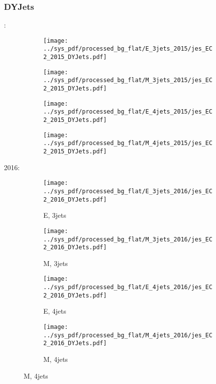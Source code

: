 \documentclass{beamer}
\begin{document}
\begin{frame}
\frametitle{DYJets}
\fontsize{5}{1}:
\begin{figure}
\centering
\begin{subfigure}[b]{0.24\textwidth}
\texttt{[image: ../sys\_pdf/processed\_bg\_flat/E\_3jets\_2015/jes\_EC2\_2015\_DYJets.pdf]}
\end{subfigure}
\begin{subfigure}[b]{0.24\textwidth}
\texttt{[image: ../sys\_pdf/processed\_bg\_flat/M\_3jets\_2015/jes\_EC2\_2015\_DYJets.pdf]}
\end{subfigure}
\begin{subfigure}[b]{0.24\textwidth}
\texttt{[image: ../sys\_pdf/processed\_bg\_flat/E\_4jets\_2015/jes\_EC2\_2015\_DYJets.pdf]}
\end{subfigure}
\begin{subfigure}[b]{0.24\textwidth}
\texttt{[image: ../sys\_pdf/processed\_bg\_flat/M\_4jets\_2015/jes\_EC2\_2015\_DYJets.pdf]}
\end{subfigure}
\end{figure}
2016:
\begin{figure}
\centering
\begin{subfigure}[b]{0.24\textwidth}
\texttt{[image: ../sys\_pdf/processed\_bg\_flat/E\_3jets\_2016/jes\_EC2\_2016\_DYJets.pdf]}
\captionsetup{font=tiny}
\caption{E, 3jets}
\end{subfigure}
\begin{subfigure}[b]{0.24\textwidth}
\texttt{[image: ../sys\_pdf/processed\_bg\_flat/M\_3jets\_2016/jes\_EC2\_2016\_DYJets.pdf]}
\captionsetup{font=tiny}
\caption{M, 3jets}
\end{subfigure}
\begin{subfigure}[b]{0.24\textwidth}
\texttt{[image: ../sys\_pdf/processed\_bg\_flat/E\_4jets\_2016/jes\_EC2\_2016\_DYJets.pdf]}
\captionsetup{font=tiny}
\caption{E, 4jets}
\end{subfigure}
\begin{subfigure}[b]{0.24\textwidth}
\texttt{[image: ../sys\_pdf/processed\_bg\_flat/M\_4jets\_2016/jes\_EC2\_2016\_DYJets.pdf]}
\captionsetup{font=tiny}
\caption{M, 4jets}
\end{subfigure}
\end{figure}
\end{frame}
\end{document}
